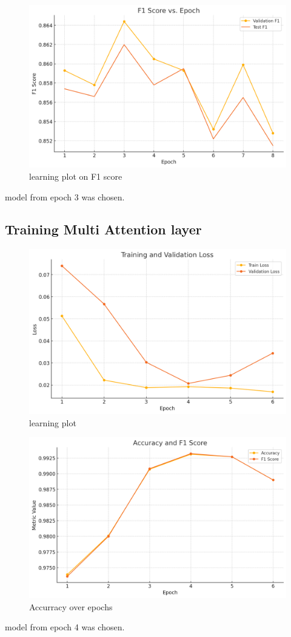 \documentclass[
]{article}
\begin{document}
\begin{figure}
\centering
\includegraphics[width=0.5\linewidth,height=\textheight,keepaspectratio]{images/Robertector_F1.png}
\caption{learning plot on F1 score}
\end{figure}

model from epoch 3 was chosen.

\subsection{Training Multi Attention
layer}\label{training-multi-attention-layer-1}

\begin{figure}
\centering
\includegraphics[width=0.5\linewidth,height=\textheight,keepaspectratio]{images/learning_plot_loss.png}
\caption{learning plot}
\end{figure}

\begin{figure}
\centering
\includegraphics[width=0.5\linewidth,height=\textheight,keepaspectratio]{images/learning_plot_scores.png}
\caption{Accurracy over epochs}
\end{figure}

model from epoch 4 was chosen.
\end{document}

